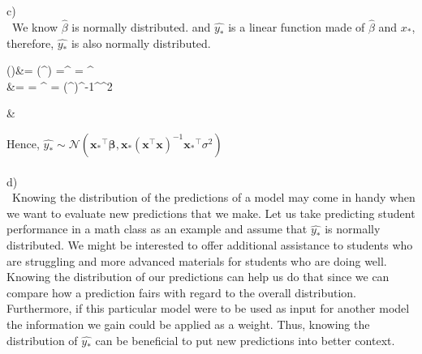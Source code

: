 \documentclass{article}
\newcommand{\Var}{\mathrm{Var}}
\begin{document}
\\
\\
c)\\\
We know $\hat{\beta}$ is normally distributed. and $\hat{y_*}$ is a linear function made of $\hat{\beta}$ and $x_*$, therefore, $\hat{y_*}$ is also normally distributed. 
\begin{flalign*}
\begin{split}
()&= (^\intercal \mathbf{\hat{\beta}})
=^\intercal \mathop{\mathbb{E}(\hat{\beta})}
= \mathbf{x_*}^\intercal \mathbf{\beta}\\
\Var{(\hat{y_*})} &= \Var{(^\intercal \mathbf{\hat{\beta}})} 
=  \Var{\hat{\beta}} \mathbf{x_*}^\intercal 
=\mathbf{x_*} (^\intercal \mathbf{x})^{-1}^\intercal  \sigma ^2
\end{split}&
\end{flalign*}

Hence, $\hat{y_*} \sim \mathcal{N}(\mathbf{x_*}^\intercal \mathbf{\beta},\mathbf{x_*} (\mathbf{x}^\intercal \mathbf{x})^{-1}\mathbf{x_*}^\intercal  \sigma ^2)\ $
\\
\\
d)\\\
Knowing the distribution of the predictions of a model may come in handy when we want to evaluate new predictions that we make. Let us take predicting student performance in a math class as an example and assume that $\hat{y_*}$ is normally distributed. We might be interested to offer additional assistance to students who are struggling and more advanced materials for students who are doing well. Knowing the distribution of our predictions can help us do that since we can compare how a prediction fairs with regard to the overall distribution. Furthermore, if this particular model were to be used as input for another model the information we gain could be applied as a weight. Thus, knowing the distribution of $\hat{y_*}$ can be beneficial to put new predictions into better context.
\end{document}
